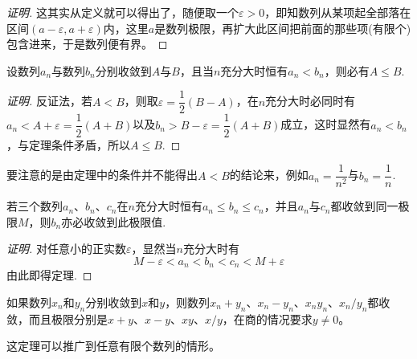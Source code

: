 \begin{proof}[证明]
  这其实从定义就可以得出了，随便取一个$\varepsilon>0$，即知数列从某项起全部落在区间$(a-\varepsilon, a+\varepsilon)$内，这里$a$是数列极限，再扩大此区间把前面的那些项(有限个)包含进来，于是数列便有界。
\end{proof}

\begin{theorem}[保不等式性]
  设数列$a_n$与数列$b_n$分别收敛到$A$与$B$，且当$n$充分大时恒有$a_n<b_n$，则必有$A \leqslant B$.
\end{theorem}

\begin{proof}[证明]
  反证法，若$A<B$，则取$\varepsilon=\dfrac{1}{2}(B-A)$，在$n$充分大时必同时有$a_n<A+\varepsilon=\dfrac{1}{2}(A+B)$以及$b_n>B-\varepsilon=\dfrac{1}{2}(A+B)$成立，这时显然有$a_n<b_n$，与定理条件矛盾，所以$A \leqslant B$.
\end{proof}

要注意的是由定理中的条件并不能得出$A<B$的结论来，例如$a_n=\dfrac{1}{n^2}$与$b_n=\dfrac{1}{n}$.

\begin{theorem}
 若三个数列$a_n$、$b_n$、$c_n$在$n$充分大时恒有$a_n \leqslant b_n \leqslant c_n$，并且$a_n$与$c_n$都收敛到同一极限$M$，则$b_n$亦必收敛到此极限值. 
\end{theorem}

\begin{proof}[证明]
  对任意小的正实数$\varepsilon$，显然当$n$充分大时有
  \[ M-\varepsilon < a_n < b_n < c_n < M+\varepsilon \]
  由此即得定理.
\end{proof}

\begin{theorem}
  如果数列$x_n$和$y_n$分别收敛到$x$和$y$，则数列$x_n+y_n$、$x_n-y_n$、$x_ny_n$、$x_n/y_n$都收敛，而且极限分别是$x+y$、$x-y$、$xy$、$x/y$，在商的情况要求$y \neq 0$。
\end{theorem}

这定理可以推广到任意有限个数列的情形。

